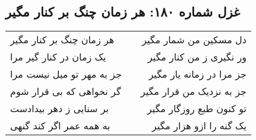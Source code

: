 \begin{center}
\section*{غزل شماره ۱۸۰: هر زمان چنگ بر کنار مگیر}
\label{sec:180}
\begin{longtable}{l p{0.5cm} r}
هر زمان چنگ بر کنار مگیر
&&
دل مسکین من شمار مگیر
\\
یک زمان در کنار گیر مرا
&&
ور نگیری ز من کنار مگیر
\\
جز به مهر تو میل نیست مرا
&&
جز مرا در زمانه یار مگیر
\\
گر نخواهی که بی قرار شوم
&&
جز به نزدیک من قرار مگیر
\\
بر سنایی ز دهر بیدادست
&&
تو کنون طبع روزگار مگیر
\\
به همه عمر اگر کند گنهی
&&
یک گنه را ازو هزار مگیر
\\
\end{longtable}
\end{center}
